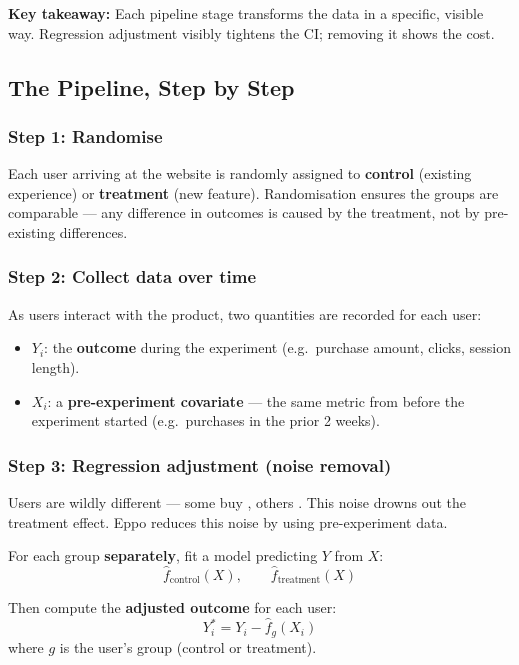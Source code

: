\documentclass[12pt, a4paper]{article}
\begin{document}
\begin{simulation}
\textbf{Key takeaway:}
Each pipeline stage transforms the data in a specific, visible way.
Regression adjustment visibly tightens the CI; removing it shows the cost.
\end{simulation}


\subsection{The Pipeline, Step by Step}

\subsubsection*{Step 1: Randomise}

Each user arriving at the website is randomly assigned to \textbf{control}
(existing experience) or \textbf{treatment} (new feature).  Randomisation
ensures the groups are comparable --- any difference in outcomes is caused by
the treatment, not by pre-existing differences.

\subsubsection*{Step 2: Collect data over time}

As users interact with the product, two quantities are recorded for each user:
\begin{itemize}[nosep]
  \item $Y_i$: the \textbf{outcome} during the experiment (e.g.\ purchase
        amount, clicks, session length).
  \item $X_i$: a \textbf{pre-experiment covariate} --- the same metric from
        before the experiment started (e.g.\ purchases in the prior 2 weeks).
\end{itemize}

\subsubsection*{Step 3: Regression adjustment (noise removal)}

Users are wildly different --- some buy , others .
This noise drowns out the treatment effect.  Eppo reduces this noise by
using pre-experiment data.

For each group \textbf{separately}, fit a model predicting $Y$ from $X$:
\[
  \hat{f}_{\text{control}}(X), \qquad \hat{f}_{\text{treatment}}(X)
\]

Then compute the \textbf{adjusted outcome} for each user:
\[
  Y^*_i = Y_i - \hat{f}_g(X_i)
\]
where $g$ is the user's group (control or treatment).
\end{document}

